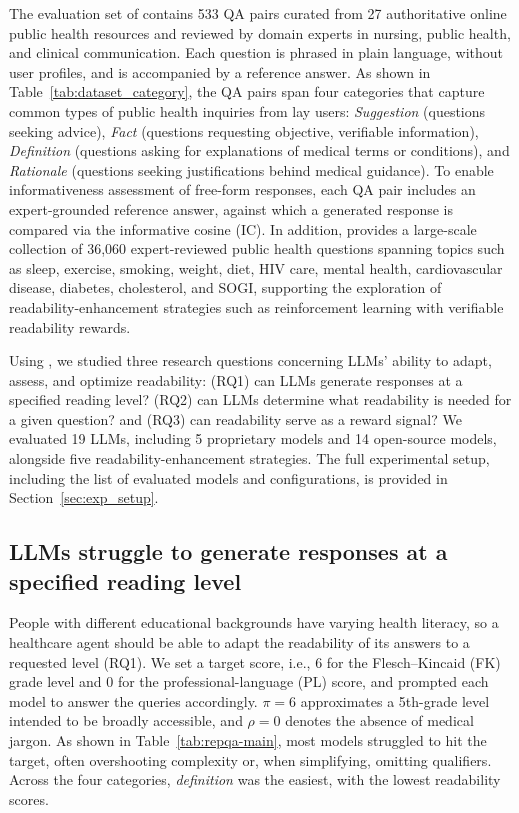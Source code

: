 The evaluation set of \repqa contains 533 QA pairs curated from 27 authoritative online public health resources and reviewed by domain experts in nursing, public health, and clinical communication.
Each question is phrased in plain language, without user profiles, and is accompanied by a reference answer.
As shown in Table~\ref{tab:dataset_category}, the QA pairs span four categories that capture common types of public health inquiries from lay users: \textit{Suggestion} (questions seeking advice), \textit{Fact} (questions requesting objective, verifiable information), \textit{Definition} (questions asking for explanations of medical terms or conditions), and \textit{Rationale} (questions seeking justifications behind medical guidance).
To enable informativeness assessment of free-form responses, each QA pair includes an expert-grounded reference answer, against which a generated response is compared via the informative cosine (IC).
In addition, \repqa provides a large-scale collection of 36,060 expert-reviewed public health questions spanning topics such as sleep, exercise, smoking, weight, diet, HIV care, mental health, cardiovascular disease, diabetes, cholesterol, and SOGI, supporting the exploration of readability-enhancement strategies such as reinforcement learning with verifiable readability rewards.

Using \repqa, we studied three research questions concerning LLMs' ability to adapt, assess, and optimize readability:
(RQ1) can LLMs generate responses at a specified reading level?
(RQ2) can LLMs determine what readability is needed for a given question?
and (RQ3) can readability serve as a reward signal?
We evaluated 19 LLMs, including 5 proprietary models and 14 open-source models, alongside five readability-enhancement strategies. The full experimental setup, including the list of evaluated models and configurations, is provided in Section~\ref{sec:exp_setup}.

\subsection{LLMs struggle to generate responses at a specified reading level}

People with different educational backgrounds have varying health literacy, so a healthcare agent should be able to adapt the readability of its answers to a requested level (RQ1).
We set a target score, i.e., 6 for the Flesch–Kincaid (FK) grade level and 0 for the professional-language (PL) score, and prompted each model to answer the queries accordingly. $\pi{=}6$ approximates a 5th-grade level intended to be broadly accessible, and $\rho{=}0$ denotes the absence of medical jargon.
As shown in Table~\ref{tab:repqa-main}, most models struggled to hit the target, often overshooting complexity or, when simplifying, omitting qualifiers.
Across the four categories, \textit{definition} was the easiest, with the lowest readability scores.

